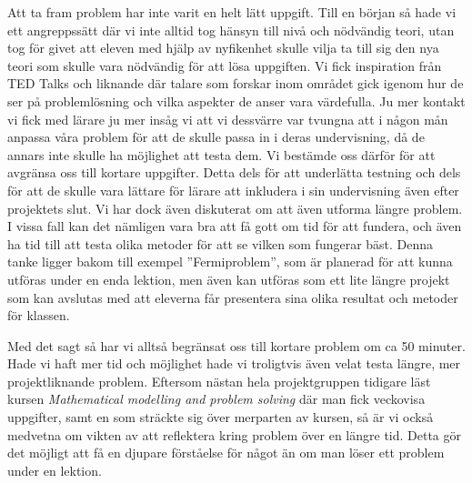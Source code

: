 \noindent \textcolor{Mahogany}{Att ta fram problem har inte varit en helt lätt uppgift. Till en början så hade vi ett angreppssätt där vi inte alltid tog hänsyn till nivå och nödvändig teori, utan tog för givet att eleven med hjälp av nyfikenhet skulle vilja ta till sig den nya teori som skulle vara nödvändig för att lösa uppgiften. Vi fick inspiration från TED Talks och liknande där talare som forskar inom området gick igenom hur de ser på problemlösning och vilka aspekter de anser vara värdefulla. Ju mer kontakt vi fick med lärare ju mer insåg vi att vi dessvärre var tvungna att i någon mån anpassa våra problem för att de skulle passa in i deras undervisning, då de annars inte skulle ha möjlighet att testa dem. Vi bestämde oss därför för att avgränsa oss till kortare uppgifter. Detta dels för att underlätta testning och dels för att de skulle vara lättare för lärare att inkludera i sin undervisning även efter projektets slut. Vi har dock även diskuterat om att även utforma längre problem. I vissa fall kan det nämligen vara bra att få gott om tid för att fundera, och även ha tid till att testa olika metoder för att se vilken som fungerar bäst. Denna tanke ligger bakom till exempel ''Fermiproblem'', som är planerad för att kunna utföras under en enda lektion, men även kan utföras som ett lite längre projekt som kan avslutas med att eleverna får presentera sina olika resultat och metoder för klassen.}

\textcolor{Mahogany}{Med det sagt så har vi alltså begränsat oss till kortare problem om ca 50 minuter. Hade vi haft mer tid och möjlighet hade vi troligtvis även velat testa längre, mer projektliknande problem. Eftersom nästan hela projektgruppen tidigare läst kursen \textsl{Mathematical modelling and problem solving}\cite{matmod} där man fick veckovisa uppgifter, samt en som sträckte sig över merparten av kursen, så är vi också medvetna om vikten av att reflektera kring problem över en längre tid. Detta gör det möjligt att få en djupare förståelse för något än om man löser ett problem under en lektion.}